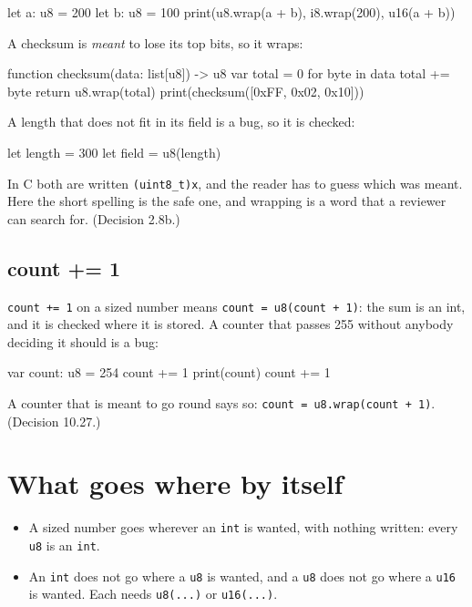 \begin{zeno}
let a: u8 = 200
let b: u8 = 100
print(u8.wrap(a + b), i8.wrap(200), u16(a + b))
\end{zeno}

A checksum is \emph{meant} to lose its top bits, so it wraps:

\begin{zeno}
function checksum(data: list[u8]) -> u8 {
    var total = 0
    for byte in data {
        total += byte
    }
    return u8.wrap(total)
}
print(checksum([0xFF, 0x02, 0x10]))
\end{zeno}

A length that does not fit in its field is a bug, so it is checked:

\begin{zeno}[fails=yes]
let length = 300
let field = u8(length)
\end{zeno}

\begin{why}
In C both are written \verb|(uint8_t)x|, and the reader has to guess
which was meant. Here the short spelling is the safe one, and wrapping
is a word that a reviewer can search for. (Decision 2.8b.)
\end{why}

\subsection{count += 1}

\verb|count += 1| on a sized number means \verb|count = u8(count + 1)|:
the sum is an int, and it is checked where it is stored. A counter that
passes 255 without anybody deciding it should is a bug:

\begin{zeno}[fails=yes]
var count: u8 = 254
count += 1
print(count)
count += 1
\end{zeno}

A counter that is meant to go round says so:
\verb|count = u8.wrap(count + 1)|. (Decision 10.27.)

\section{What goes where by itself}

\begin{itemize}
\item A sized number goes wherever an \verb|int| is wanted, with
  nothing written: every \verb|u8| is an \verb|int|.
\item An \verb|int| does not go where a \verb|u8| is wanted, and a
  \verb|u8| does not go where a \verb|u16| is wanted. Each needs
  \verb|u8(...)| or \verb|u16(...)|.
\end{itemize}

